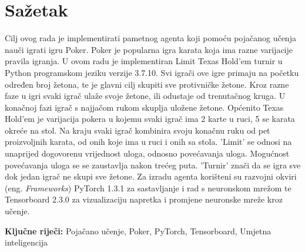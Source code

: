 \section*{Sažetak}
\label{sec:summary}
Cilj ovog rada je implementirati pametnog agenta koji pomoću pojačanog učenja nauči igrati igru Poker. Poker je popularna igra karata koja ima razne varijacije pravila igranja. U ovom radu je implementiran Limit Texas Hold'em turnir u Python programskom jeziku verzije 3.7.10. Svi igrači ove igre primaju na početku određen broj žetona, te je glavni cilj skupiti sve protivničke žetone. Kroz razne faze u igri svaki igrač ulaže svoje žetone, ili odustaje od trenutačnog kruga. U konačnoj fazi igrač s najjačom rukom skuplja uložene žetone. Općenito Texas Hold'em je varijacija pokera u kojemu svaki igrač ima 2 karte u ruci, 5 se karata okreće na stol. Na kraju svaki igrač kombinira svoju konačnu ruku od pet proizvoljnih karata, od onih koje ima u ruci i onih sa stola. 'Limit' se odnosi na unaprijed dogovorenu vrijednost uloga, odnosno povećavanja uloga. Mogućnost povećavanja uloga se se zaustavlja nakon trećeg puta. 'Turnir' znači da se igra sve dok jedan igrač ne skupi sve žetone. Za izradu agenta korišteni su razvojni okviri (eng. \textit{Frameworks}) PyTorch 1.3.1 za sastavljanje i rad s neuronskom mrežom te Tensorboard 2.3.0 za vizualizaciju napretka i promjene neuronske mreže kroz učenje.

\noindent
\textbf{Ključne riječi:} Pojačano učenje, Poker, PyTorch, Tensorboard, Umjetna inteligencija